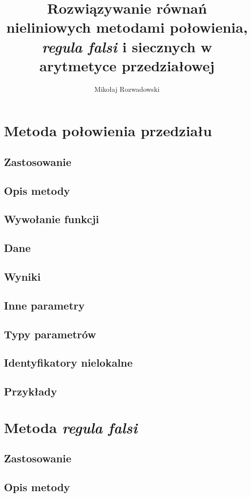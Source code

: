 \documentclass[12pt]{article}
\title{Rozwiązywanie równań nieliniowych metodami połowienia, \textsl{regula falsi} i siecznych w arytmetyce przedziałowej}
\author{Mikołaj Rozwadowski}
\begin{document}
	\maketitle

	\section{Metoda połowienia przedziału}
		\subsection{Zastosowanie}
		\subsection{Opis metody}
		\subsection{Wywołanie funkcji}
		\subsection{Dane}
		\subsection{Wyniki}
		\subsection{Inne parametry}
		\subsection{Typy parametrów}
		\subsection{Identyfikatory nielokalne}
		\subsection{Przykłady}

	\section{Metoda \textsl{regula falsi}}
		\subsection{Zastosowanie}
		\subsection{Opis metody}
\end{document}
